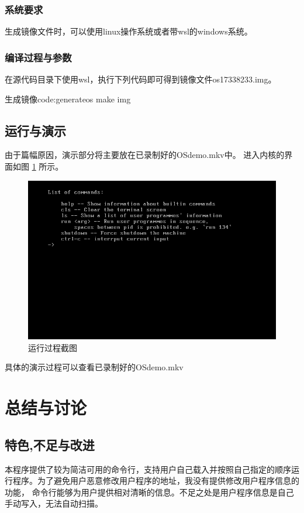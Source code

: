 \documentclass[a4paper, 11pt]{article} %
\newcounter{code}
\begin{document}
\subsubsection{系统要求}

生成镜像文件时，可以使用linux操作系统或者带wsl的windows系统。

\subsubsection{编译过程与参数}

在源代码目录下使用wsl，执行下列代码即可得到镜像文件os17338233.img。
\begin{code}{生成镜像}{code:generateos}
make img
\end{code}

\subsection{运行与演示}
由于篇幅原因，演示部分将主要放在已录制好的OSdemo.mkv中。
进入内核的界面如图 \ref{fig:run} 所示。

\begin{figure}[H]
  \centering
  \includegraphics[width=0.8\linewidth]{shell1.png}
  \caption{运行过程截图}
  \label{fig:run}
\end{figure}
具体的演示过程可以查看已录制好的OSdemo.mkv
\section{总结与讨论}



\subsection{特色,不足与改进}

本程序提供了较为简洁可用的命令行，支持用户自己载入并按照自己指定的顺序运行程序。为了避免用户恶意修改用户程序的地址，我没有提供修改用户程序信息的功能，
命令行能够为用户提供相对清晰的信息。不足之处是用户程序信息是自己手动写入，无法自动扫描。
\end{document}

